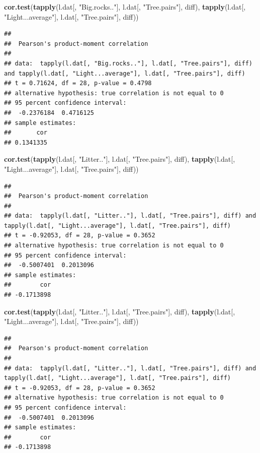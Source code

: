 \documentclass[]{article}
\newenvironment{Shaded}{\begin{snugshade}}{\end{snugshade}}
\newcommand{\KeywordTok}[1]{\textcolor[rgb]{0.13,0.29,0.53}{\textbf{{#1}}}}
\newcommand{\StringTok}[1]{\textcolor[rgb]{0.31,0.60,0.02}{{#1}}}
\newcommand{\NormalTok}[1]{{#1}}
\begin{document}
\begin{Shaded}
\begin{Highlighting}[]
\KeywordTok{cor.test}\NormalTok{(}\KeywordTok{tapply}\NormalTok{(l.dat[, }\StringTok{"Big.rocks.."}\NormalTok{], l.dat[, }\StringTok{"Tree.pairs"}\NormalTok{], diff),}
         \KeywordTok{tapply}\NormalTok{(l.dat[, }\StringTok{"Light...average"}\NormalTok{], l.dat[, }\StringTok{"Tree.pairs"}\NormalTok{], diff))}
\end{Highlighting}
\end{Shaded}

\begin{verbatim}
## 
##  Pearson's product-moment correlation
## 
## data:  tapply(l.dat[, "Big.rocks.."], l.dat[, "Tree.pairs"], diff) and tapply(l.dat[, "Light...average"], l.dat[, "Tree.pairs"], diff)
## t = 0.71624, df = 28, p-value = 0.4798
## alternative hypothesis: true correlation is not equal to 0
## 95 percent confidence interval:
##  -0.2376184  0.4716125
## sample estimates:
##       cor 
## 0.1341335
\end{verbatim}

\begin{Shaded}
\begin{Highlighting}[]
\KeywordTok{cor.test}\NormalTok{(}\KeywordTok{tapply}\NormalTok{(l.dat[, }\StringTok{"Litter.."}\NormalTok{], l.dat[, }\StringTok{"Tree.pairs"}\NormalTok{], diff),}
         \KeywordTok{tapply}\NormalTok{(l.dat[, }\StringTok{"Light...average"}\NormalTok{], l.dat[, }\StringTok{"Tree.pairs"}\NormalTok{], diff))}
\end{Highlighting}
\end{Shaded}

\begin{verbatim}
## 
##  Pearson's product-moment correlation
## 
## data:  tapply(l.dat[, "Litter.."], l.dat[, "Tree.pairs"], diff) and tapply(l.dat[, "Light...average"], l.dat[, "Tree.pairs"], diff)
## t = -0.92053, df = 28, p-value = 0.3652
## alternative hypothesis: true correlation is not equal to 0
## 95 percent confidence interval:
##  -0.5007401  0.2013096
## sample estimates:
##        cor 
## -0.1713898
\end{verbatim}

\begin{Shaded}
\begin{Highlighting}[]
\KeywordTok{cor.test}\NormalTok{(}\KeywordTok{tapply}\NormalTok{(l.dat[, }\StringTok{"Litter.."}\NormalTok{], l.dat[, }\StringTok{"Tree.pairs"}\NormalTok{], diff),}
         \KeywordTok{tapply}\NormalTok{(l.dat[, }\StringTok{"Light...average"}\NormalTok{], l.dat[, }\StringTok{"Tree.pairs"}\NormalTok{], diff))}
\end{Highlighting}
\end{Shaded}

\begin{verbatim}
## 
##  Pearson's product-moment correlation
## 
## data:  tapply(l.dat[, "Litter.."], l.dat[, "Tree.pairs"], diff) and tapply(l.dat[, "Light...average"], l.dat[, "Tree.pairs"], diff)
## t = -0.92053, df = 28, p-value = 0.3652
## alternative hypothesis: true correlation is not equal to 0
## 95 percent confidence interval:
##  -0.5007401  0.2013096
## sample estimates:
##        cor 
## -0.1713898
\end{verbatim}
\end{document}
